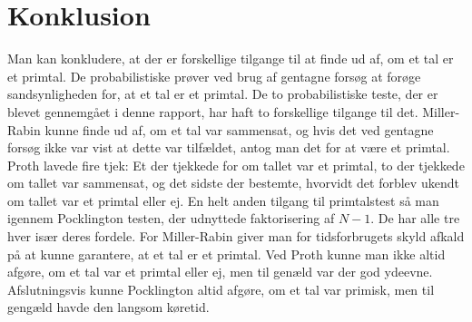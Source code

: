 \section{Konklusion}
Man kan konkludere, at der er forskellige tilgange til at finde ud af, om et tal er et primtal. 
De probabilistiske prøver ved brug af gentagne forsøg at forøge sandsynligheden for, at et tal er 
et primtal. De to probabilistiske teste, der er blevet gennemgået i denne rapport, har haft to forskellige
tilgange til det. Miller-Rabin kunne finde ud af, om et tal var sammensat, og hvis det ved gentagne forsøg ikke
var vist at dette var tilfældet, antog man det for at være et primtal. Proth lavede fire tjek: Et der tjekkede for om tallet 
var et primtal, to der tjekkede om tallet var sammensat, og det sidste der bestemte, hvorvidt det forblev ukendt om tallet var et primtal eller ej. 
En helt anden tilgang til primtalstest så man igennem Pocklington testen, der udnyttede faktorisering af $N-1$.
De har alle tre hver især deres fordele. For Miller-Rabin giver man for tidsforbrugets skyld afkald på at kunne garantere,
at et tal er et primtal. Ved Proth kunne man ikke altid afgøre, om et tal var et primtal  eller ej, men til genæld var der god ydeevne. 
Afslutningsvis kunne Pocklington altid afgøre, om et tal var primisk, men til gengæld havde den langsom køretid.
